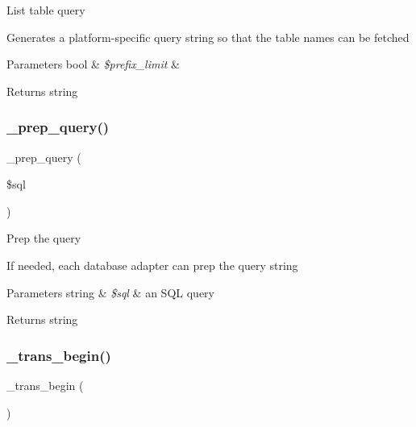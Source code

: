 List table query

Generates a platform-\/specific query string so that the table names can be fetched


\begin{DoxyParams}[1]{Parameters}
bool & {\em \$prefix\+\_\+limit} & \\
\hline
\end{DoxyParams}
\begin{DoxyReturn}{Returns}
string 
\end{DoxyReturn}
\mbox{\label{class_c_i___d_b__mysqli__driver_a86af88ef0fa6d44ab4691e3f53270339}} 
\subsubsection{\texorpdfstring{\+\_\+prep\+\_\+query()}{\_prep\_query()}}
{\footnotesize\ttfamily \+\_\+prep\+\_\+query (\begin{DoxyParamCaption}\item[{}]{\$sql }\end{DoxyParamCaption})\hspace{0.3cm}{\ttfamily [protected]}}

Prep the query

If needed, each database adapter can prep the query string


\begin{DoxyParams}[1]{Parameters}
string & {\em \$sql} & an S\+QL query \\
\hline
\end{DoxyParams}
\begin{DoxyReturn}{Returns}
string 
\end{DoxyReturn}
\mbox{\label{class_c_i___d_b__mysqli__driver_ac81ac882c1d54347d810199a15856aac}} 
\subsubsection{\texorpdfstring{\+\_\+trans\+\_\+begin()}{\_trans\_begin()}}
{\footnotesize\ttfamily \+\_\+trans\+\_\+begin (\begin{DoxyParamCaption}{ }\end{DoxyParamCaption})\hspace{0.3cm}{\ttfamily [protected]}}

